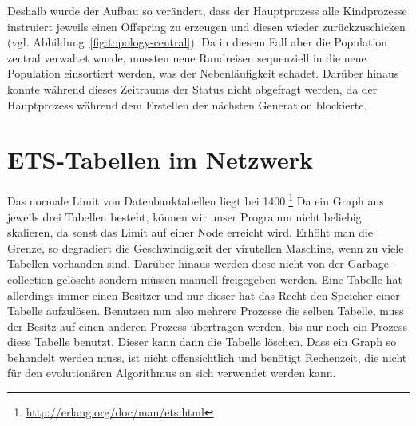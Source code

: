 Deshalb wurde der Aufbau so verändert, dass der Hauptprozess alle
Kindprozesse instruiert jeweils einen Offspring zu erzeugen und diesen
wieder zurückzuschicken (vgl. Abbildung~\ref{fig:topology-central}).
Da in diesem Fall aber die Population zentral verwaltet wurde, mussten
neue Rundreisen sequenziell in die neue Population einsortiert werden,
was der Nebenläufigkeit schadet.  Darüber hinaus konnte während dieses
Zeitraums der Status nicht abgefragt werden, da der Hauptprozess
während dem Erstellen der nächsten Generation blockierte.

\begin{SCfigure}
  \caption[Verteilte Erzeugung von Offsprings]
  {\label{fig:topology-central} Die Kindprozesse erzeugen einzelne
    Rundreisen und schicken diese an den „master“ zurück.  Dieser muss
    die Rundreisen dann in die eigene Population einsortieren.}
\end{SCfigure}

\section{ETS-Tabellen im Netzwerk}
\label{sec:ets}

Das normale Limit von Datenbanktabellen liegt bei
1400.\footnote{\url{http://erlang.org/doc/man/ets.html}} \hskip2pt Da
ein Graph aus jeweils drei Tabellen besteht, können wir unser Programm
nicht beliebig skalieren, da sonst das Limit auf einer Node erreicht
wird.  Erhöht man die Grenze, so degradiert die Geschwindigkeit der
virutellen Maschine, wenn zu viele Tabellen vorhanden sind.  Darüber
hinaus werden diese nicht von der Garbage-collection gelöscht sondern
müssen manuell freigegeben werden.  Eine Tabelle hat allerdings immer
einen Besitzer und nur dieser hat das Recht den Speicher einer Tabelle
aufzulösen.  Benutzen nun also mehrere Prozesse die selben Tabelle,
muss der Besitz auf einen anderen Prozess übertragen werden, bis nur
noch ein Prozess diese Tabelle benutzt.  Dieser kann dann die Tabelle
löschen.  Dass ein Graph so behandelt werden muss, ist nicht
offensichtlich und benötigt Rechenzeit, die nicht für den
evolutionären Algorithmus an sich verwendet werden kann.

